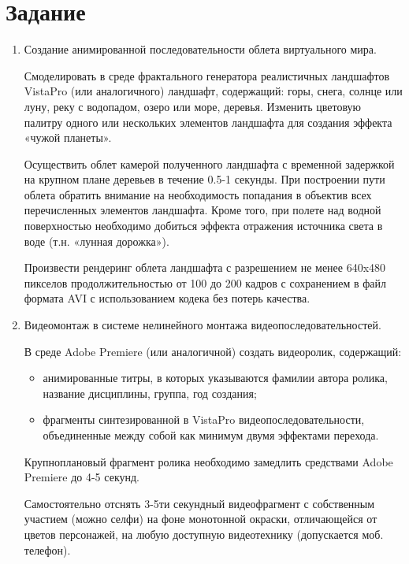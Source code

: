 \section{Задание}

\begin{enumerate}

\item Создание анимированной последовательности облета виртуального мира.

Смоделировать в среде фрактального генератора реалистичных ландшафтов VistaPro (или аналогичного) ландшафт, содержащий: горы, снега, солнце или луну, реку с водопадом, озеро или море, деревья. Изменить цветовую палитру одного или нескольких элементов ландшафта для создания эффекта «чужой планеты».

Осуществить облет камерой полученного ландшафта с временной задержкой на крупном плане деревьев в течение 0.5-1 секунды. При построении пути облета обратить внимание на необходимость попадания в объектив всех перечисленных элементов ландшафта. Кроме того, при полете над водной поверхностью необходимо добиться эффекта отражения источника света в воде (т.н. «лунная дорожка»).

Произвести рендеринг облета ландшафта с разрешением не менее 640x480 пикселов продолжительностью от 100 до 200 кадров с сохранением в файл формата AVI с использованием кодека без потерь качества.

\item  Видеомонтаж в системе нелинейного монтажа видеопоследовательностей.

В среде Adobe Premiere (или аналогичной) создать видеоролик, содержащий:

    \begin{itemize}
    \item анимированные титры, в которых указываются фамилии автора ролика, название дисциплины, группа, год создания;

    \item фрагменты синтезированной в VistaPro видеопоследовательности, объединенные между собой как минимум двумя эффектами перехода.
    \end{itemize}

Крупноплановый фрагмент ролика необходимо замедлить средствами Adobe Premiere до 4-5 секунд.

Самостоятельно отснять 3-5ти секундный видеофрагмент с собственным участием (можно селфи) на фоне монотонной окраски, отличающейся от цветов персонажей, на любую доступную видеотехнику (допускается моб. телефон).


\end{enumerate}
